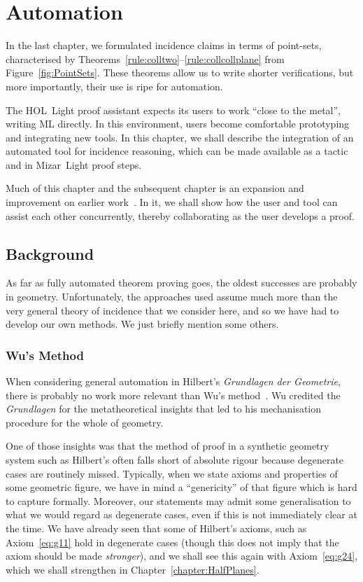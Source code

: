 \chapter{Automation}\label{chapter:Automation}
In the last chapter, we formulated incidence claims in terms of point-sets, characterised by Theorems~\ref{rule:colltwo}--\ref{rule:collcollplane} from Figure~\ref{fig:PointSets}. These theorems allow us to write shorter verifications, but more importantly, their use is ripe for automation. 

The HOL~Light proof assistant expects its users to work ``close to the metal'', writing ML directly. In this environment, users become comfortable prototyping and  integrating new tools. In this chapter, we shall describe the integration of an automated tool for incidence reasoning, which can be made available as a tactic and in Mizar~Light proof steps.

Much of this chapter and the subsequent chapter is an expansion and improvement on earlier work~\cite{ScottExploring,ScottComposable,ScottCombinator}. In it, we shall show how the user and tool can assist each other concurrently, thereby collaborating as the user develops a proof.

\section{Background}
As far as fully automated theorem proving goes, the oldest successes are probably in geometry. Unfortunately, the approaches used assume much more than the very general theory of incidence that we consider here, and so we have had to develop our own methods. We just briefly mention some others.

\subsection{Wu's Method}
When considering general automation in Hilbert's \emph{Grundlagen der Geometrie}, there is probably no work more relevant than Wu's method~\cite{WuMechanicalTheoremProving}. Wu credited the \emph{Grundlagen} for the metatheoretical insights that led to his mechanisation procedure for the whole of geometry.

One of those insights was that the method of proof in a synthetic geometry system such as Hilbert's often falls short of absolute rigour because degenerate cases are routinely missed. Typically, when we state axioms and properties of some geometric figure, we have in mind a ``genericity'' of that figure which is hard to capture formally. Moreover, our statements may admit some generalisation to what we would regard as degenerate cases, even if this is not immediately clear at the time. We have already seen that some of Hilbert's axioms, such as Axiom~\ref{eq:g11} hold in degenerate cases (though this does not imply that the axiom should be made \emph{stronger}), and we shall see this again with Axiom~\ref{eq:g24}, which we shall strengthen in Chapter~\ref{chapter:HalfPlanes}.

